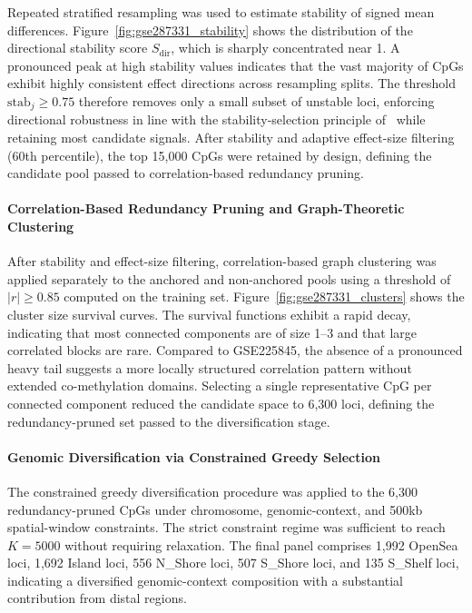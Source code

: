 Repeated stratified resampling was used to estimate stability 
of signed mean differences. Figure~\ref{fig:gse287331_stability} 
shows the distribution of the directional stability score 
$S_{\mathrm{dir}}$, which is sharply concentrated near 1. 
A pronounced peak at high stability values indicates that 
the vast majority of CpGs exhibit highly consistent effect 
directions across resampling splits.
The threshold $\mathrm{stab}_j \geq 0.75$ therefore removes 
only a small subset of unstable loci, enforcing directional 
robustness in line with the stability-selection principle 
of~\cite{Meinshausen2010} while retaining most candidate signals.
After stability and adaptive effect-size filtering 
(60th percentile), the top 15{,}000 CpGs were retained by design, 
defining the candidate pool passed to correlation-based 
redundancy pruning.


\paragraph{Correlation-Based Redundancy Pruning and Graph-Theoretic Clustering}

After stability and effect-size filtering, correlation-based 
graph clustering was applied separately to the anchored 
and non-anchored pools using a threshold of $|r| \ge 0.85$ 
computed on the training set. 
Figure~\ref{fig:gse287331_clusters} shows the cluster size 
survival curves.
The survival functions exhibit a rapid decay, indicating that 
most connected components are of size 1--3 and that large 
correlated blocks are rare. Compared to GSE225845, the absence 
of a pronounced heavy tail suggests a more locally structured 
correlation pattern without extended co-methylation domains.
Selecting a single representative CpG per connected component 
reduced the candidate space to 6{,}300 loci, defining the 
redundancy-pruned set passed to the diversification stage.

\paragraph{Genomic Diversification via Constrained Greedy Selection}

The constrained greedy diversification procedure was applied 
to the 6{,}300 redundancy-pruned CpGs under chromosome, 
genomic-context, and 500kb spatial-window constraints. 
The strict constraint regime was sufficient to reach 
$K=5000$ without requiring relaxation.
The final panel comprises 1{,}992 OpenSea loci, 1{,}692 Island loci, 
556 N\_Shore loci, 507 S\_Shore loci, and 135 S\_Shelf loci, 
indicating a diversified genomic-context composition with a 
substantial contribution from distal regions.

